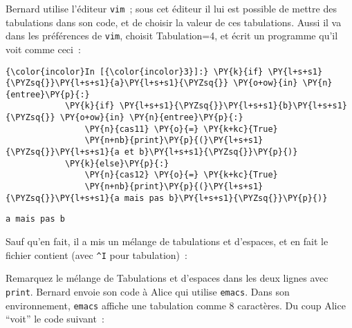     Bernard utilise l'éditeur \texttt{vim}~; sous cet éditeur il lui est
possible de mettre des tabulations dans son code, et de choisir la
valeur de ces tabulations. Aussi il va dans les préférences de
\texttt{vim}, choisit Tabulation=4, et écrit un programme qu'il voit
comme ceci~:

    \begin{Verbatim}[commandchars=\\\{\}]
{\color{incolor}In [{\color{incolor}3}]:} \PY{k}{if} \PY{l+s+s1}{\PYZsq{}}\PY{l+s+s1}{a}\PY{l+s+s1}{\PYZsq{}} \PY{o+ow}{in} \PY{n}{entree}\PY{p}{:}
            \PY{k}{if} \PY{l+s+s1}{\PYZsq{}}\PY{l+s+s1}{b}\PY{l+s+s1}{\PYZsq{}} \PY{o+ow}{in} \PY{n}{entree}\PY{p}{:}
                \PY{n}{cas11} \PY{o}{=} \PY{k+kc}{True}
                \PY{n+nb}{print}\PY{p}{(}\PY{l+s+s1}{\PYZsq{}}\PY{l+s+s1}{a et b}\PY{l+s+s1}{\PYZsq{}}\PY{p}{)}
            \PY{k}{else}\PY{p}{:}
                \PY{n}{cas12} \PY{o}{=} \PY{k+kc}{True}
                \PY{n+nb}{print}\PY{p}{(}\PY{l+s+s1}{\PYZsq{}}\PY{l+s+s1}{a mais pas b}\PY{l+s+s1}{\PYZsq{}}\PY{p}{)}
\end{Verbatim}


    \begin{Verbatim}[commandchars=\\\{\}]
a mais pas b

    \end{Verbatim}

    Sauf qu'en fait, il a mis un mélange de tabulations et d'espaces, et en
fait le fichier contient (avec \texttt{\^{}I} pour tabulation)~:

    \begin{Shaded}
\begin{Highlighting}[]
  
\OperatorTok{^} 
\OperatorTok{^}\OperatorTok{^}\OperatorTok{=} 
    \OperatorTok{^}\NormalTok{)}
\OperatorTok{^}
\OperatorTok{^}\OperatorTok{^}\OperatorTok{=} 
    \OperatorTok{^}\NormalTok{)}
\end{Highlighting}
\end{Shaded}

    Remarquez le mélange de Tabulations et d'espaces dans les deux lignes
avec \texttt{print}. Bernard envoie son code à Alice qui utilise
\texttt{emacs}. Dans son environnement, \texttt{emacs} affiche une
tabulation comme 8 caractères. Du coup Alice ``voit'' le code suivant~:


